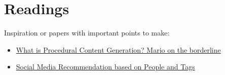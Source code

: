 \documentclass[]{article}
\begin{document}
\section{Readings}
Inspiration or papers with important points to make:
\begin{itemize}
\item \href{http://julian.togelius.com/Togelius2011What.pdf}{What is Procedural Content Generation? Mario on the borderline}
\item \href{http://delivery.acm.org/10.1145/1840000/1835484/p194-guy.pdf?ip=130.226.142.243&id=1835484&acc=ACTIVE\%20SERVICE&key=36332CD97FA87885\%2E6A18944DEFDDF4C0\%2E4D4702B0C3E38B35\%2E4D4702B0C3E38B35&CFID=605494385&CFTOKEN=58221236&__acm__=1417798342_c9dde7c05e2a19158dcc16e124ca0723}{Social Media Recommendation based on People and Tags }
\end{itemize}



\end{document}
